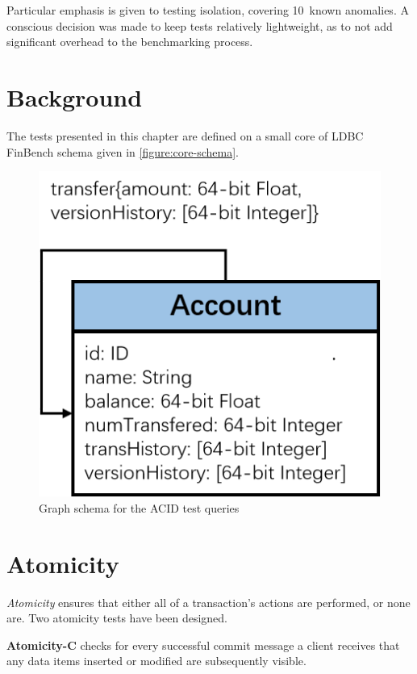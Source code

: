 Particular emphasis is given to testing isolation, covering 10~known anomalies.
A conscious decision was made to keep tests relatively lightweight, as to not 
add significant overhead to the benchmarking process.

\section{Background}

The tests presented in this chapter are defined on a small core of LDBC FinBench
schema given in \autoref{figure:core-schema}.

\begin{figure}[htbp]
    \centering
    \includegraphics[scale=0.5]{figures/acid/acid-schema}
    \caption{Graph schema for the ACID test queries}
    \label{figure:core-schema}
\end{figure}

\begin{figure}[h]
  \centering
  
\end{figure}

\section{Atomicity}

\emph{Atomicity} ensures that either all of a transaction's actions are 
performed, or none are. Two atomicity tests have been designed.

{\flushleft \textbf{Atomicity-C}} checks for every successful commit message a
client receives that any data items inserted or modified are subsequently visible.


